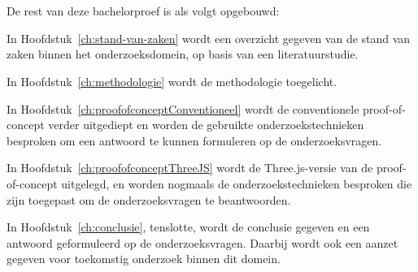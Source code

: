 \section{}%
\label{sec:opzet-bachelorproef}

De rest van deze bachelorproef is als volgt opgebouwd:

In Hoofdstuk~\ref{ch:stand-van-zaken} wordt een overzicht gegeven van de stand van zaken binnen het onderzoeksdomein, op basis van een literatuurstudie.

In Hoofdstuk~\ref{ch:methodologie} wordt de methodologie toegelicht.



In Hoofdstuk~\ref{ch:proofofconceptConventioneel} wordt de conventionele proof-of-concept verder uitgediept en worden de gebruikte onderzoekstechnieken besproken om een antwoord te kunnen formuleren op de onderzoeksvragen.

In Hoofdstuk~\ref{ch:proofofconceptThreeJS} wordt de Three.js-versie van de proof-of-concept uitgelegd, en worden nogmaals de onderzoekstechnieken besproken die zijn toegepast om de onderzoeksvragen te beantwoorden.

In Hoofdstuk~\ref{ch:conclusie}, tenslotte, wordt de conclusie gegeven en een antwoord geformuleerd op de onderzoeksvragen. Daarbij wordt ook een aanzet gegeven voor toekomstig onderzoek binnen dit domein.